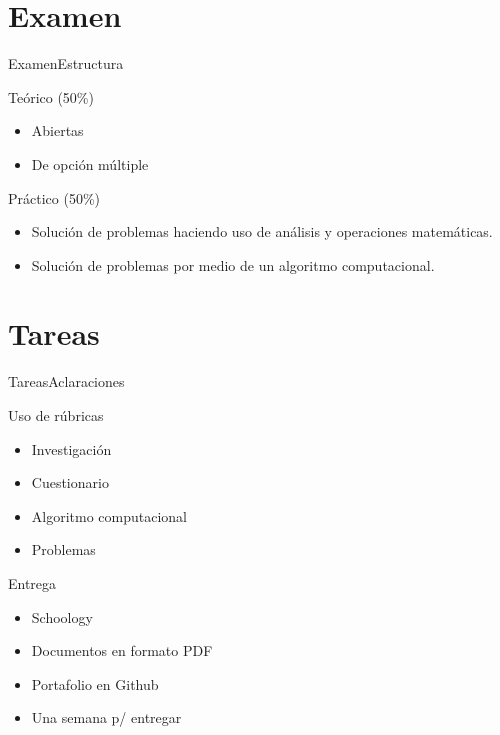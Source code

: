 \documentclass[10pt]{beamer}
\begin{document}
\section{Examen}
\begin{frame}{Examen}{Estructura}
\begin{block}{Teórico (50\%)}
    \begin{itemize}
        \item Abiertas
        \item De opción múltiple
    \end{itemize}
\end{block}

\begin{block}{Práctico (50\%)}
    \begin{itemize}
        \item Solución de problemas haciendo uso de análisis y operaciones matemáticas.
        \item Solución de problemas por medio de un algoritmo computacional.
    \end{itemize}
\end{block}

\end{frame}

\section{Tareas}
\begin{frame}{Tareas}{Aclaraciones}
\begin{block}{Uso de rúbricas}
    \begin{itemize}
        \item Investigación
        \item Cuestionario
        \item Algoritmo computacional
        \item Problemas
    \end{itemize}
\end{block}

\begin{block}{Entrega}
    \begin{itemize}
        \item Schoology
        \item Documentos en formato PDF
        \item Portafolio en Github
        \item Una semana p/ entregar
    \end{itemize}
\end{block}

\end{frame}
\end{document}
